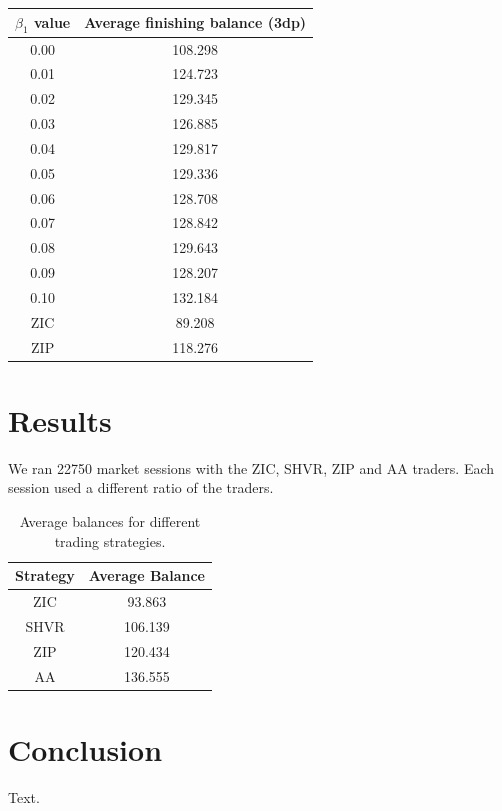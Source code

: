 \documentclass{acm_proc_article-sp}
\begin{document}
\begin{table}
  \centering
  \label{tbl:beta1_results_small}
  \begin{tabular}{ | c | c | }
    \hline
    \textbf{$\beta_1$ value} & \textbf{Average finishing balance (3dp)} \\
    \hline
    0.00 & 108.298 \\
    0.01 & 124.723 \\
    0.02 & 129.345 \\
    0.03 & 126.885 \\
    0.04 & 129.817 \\
    0.05 & 129.336 \\
    0.06 & 128.708 \\
    0.07 & 128.842 \\
    0.08 & 129.643 \\
    0.09 & 128.207 \\
    0.10 & 132.184 \\
    \hline \hline
    ZIC & 89.208 \\
    ZIP & 118.276 \\
    \hline
  \end{tabular}
\end{table}


\section{Results} \label{sec:results}

We ran 22750 market sessions with the ZIC, SHVR, ZIP and AA traders.
Each session used a different ratio of the traders.

\begin{table}
  \centering
  \begin{tabular}{ | c | c | }
    \hline
    Strategy & Average Balance \\
    \hline
    ZIC & 93.863 \\
    \hline
    SHVR & 106.139 \\
    \hline
    ZIP & 120.434 \\
    \hline
    AA & 136.555 \\
    \hline
  \end{tabular}
  \caption{Average balances for different trading strategies.}
  \label{tbl:results}
\end{table}


\section{Conclusion} \label{sec:conclusion}
Text.\\




\end{document}
